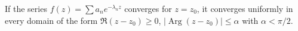 If the series $f(z) = \sum a_n e^{-\lambda_n z}$ converges for $z = z_0$, it converges uniformly in every domain of the form $\Re(z - z_0) \geq 0$, $|\operatorname{Arg}(z - z_0)| \leq \alpha$ with $\alpha < \pi/2$.
